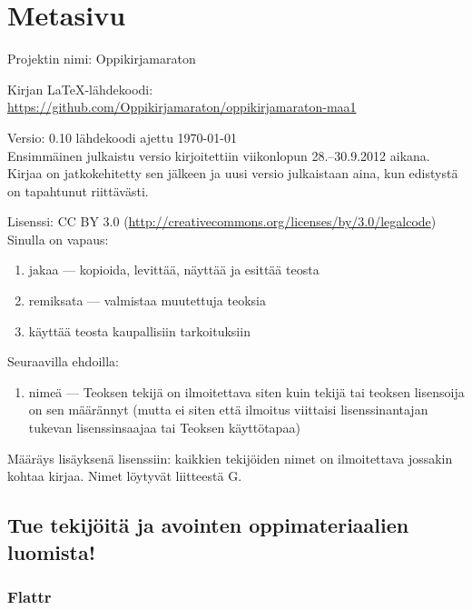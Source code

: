 \newpage

\section*{Metasivu}

Projektin nimi: Oppikirjamaraton

Kirjan LaTeX-lähdekoodi: \\
\url{https://github.com/Oppikirjamaraton/oppikirjamaraton-maa1}

Versio: 0.10 \qquad lähdekoodi ajettu \today \\
Ensimmäinen julkaistu versio kirjoitettiin viikonlopun 28.--30.9.2012 aikana. Kirjaa on jatkokehitetty sen jälkeen ja uusi versio julkaistaan aina, kun edistystä on tapahtunut riittävästi.

Lisenssi: CC BY 3.0 (\url{http://creativecommons.org/licenses/by/3.0/legalcode})\\
Sinulla on vapaus:
\begin{enumerate}
\item jakaa — kopioida, levittää, näyttää ja esittää teosta
\item remiksata — valmistaa muutettuja teoksia
\item käyttää teosta kaupallisiin tarkoituksiin
\end{enumerate}
Seuraavilla ehdoilla:
\begin{enumerate}
\item nimeä — Teoksen tekijä on ilmoitettava siten kuin tekijä tai teoksen lisensoija on sen määrännyt (mutta ei siten että ilmoitus viittaisi lisenssinantajan tukevan lisenssinsaajaa tai Teoksen käyttötapaa)
\end{enumerate}

Määräys lisäyksenä lisenssiin: kaikkien tekijöiden nimet on ilmoitettava jossakin kohtaa kirjaa. Nimet löytyvät liitteestä G.

\subsection*{Tue tekijöitä ja avointen oppimateriaalien luomista!}

\subsubsection*{Flattr}

